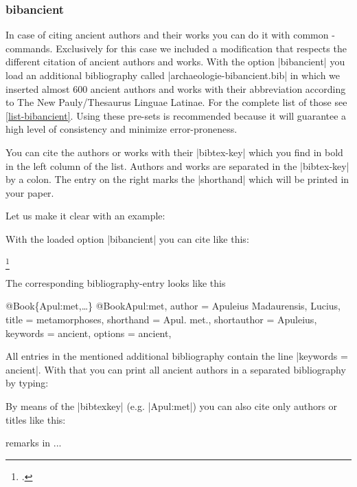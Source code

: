 \documentclass[a4paper,
10pt,
greek,
french,
spanish,
italian,
ngerman,
english,
]{ltxdoc}
\begin{document}
\subsubsection{bibancient}\label{bibancient}
In case of citing ancient authors and their works you can do it with common -commands.
Exclusively for this case we included a modification that respects the different citation of ancient authors and works.
With the option |bibancient| you load an additional bibliography called |archaeologie-bibancient.bib| in which we inserted almost 600 ancient authors and works with their abbreviation according to The New Pauly/Thesaurus Linguae Latinae.
For the complete list of those see \cref{list-bibancient}.
Using these pre-sets is recommended because it will guarantee a high level of consistency and minimize error-proneness.

You can cite the authors or works with their |bibtex-key| which you find in bold in the left column of the list. 
Authors and works are separated in the |bibtex-key| by a colon.
The entry on the right marks the |shorthand| which will be printed in your paper.

Let us make it clear with an example:

With the loaded option |bibancient| you can cite like this:  


\begin{example}
\footnote{\cite[3,2,5--7]{Apul:met}.}
\end{example}


The corresponding bibliography-entry looks like this
\begin{bibexample}[label=Apul:met]{{@}Book\{Apul:met,…\}}
@Book{Apul:met,
  author      = {Apuleius Madaurensis, Lucius},
  title       = {metamorphoses},
  shorthand   = {Apul. met.},
  shortauthor = {Apuleius},
  keywords    = {ancient},
  options     = {ancient},
}
\end{bibexample}
All entries in the mentioned additional bibliography contain the line |keywords = {ancient}|.
With that you can print all ancient authors in a separated bibliography by typing:
\begin{code}
\printbibliography[keyword=ancient]
\end{code}

\begin{refsection}
By means of the |bibtexkey| (e.g. |Apul:met|) you can also cite only authors or titles like this: 


\begin{example}
\citeauthor{Apul:met} remarks in  ...
\end{example}

\end{refsection}
\end{document}
